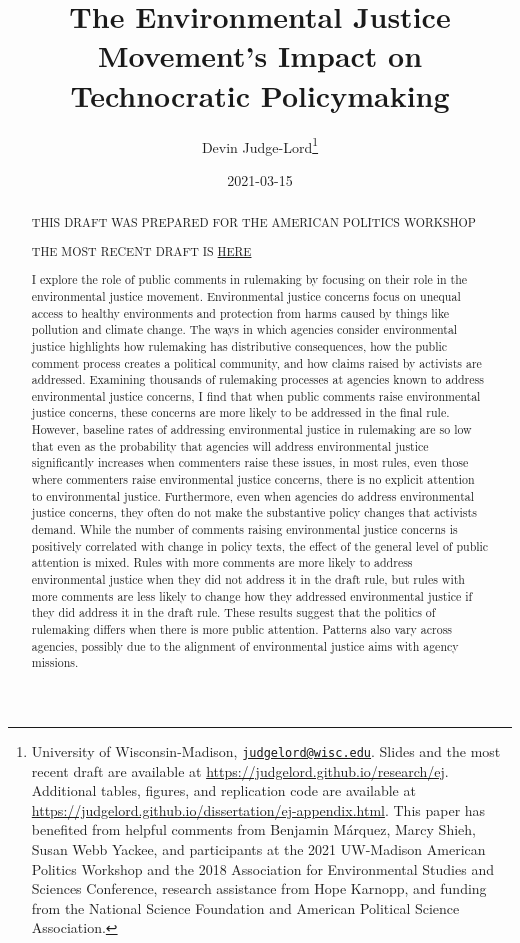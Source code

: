 \documentclass[
      12pt,
        ]{article}
\title{The Environmental Justice Movement's Impact on Technocratic Policymaking}
\author{ %
            Devin Judge-Lord\footnote{University of Wisconsin-Madison, \href{mailto:judgelord@wisc.edu}{\nolinkurl{judgelord@wisc.edu}}. Slides and the most recent draft are available at \url{https://judgelord.github.io/research/ej}. Additional tables, figures, and replication code are available at \url{https://judgelord.github.io/dissertation/ej-appendix.html}. This paper has benefited from helpful comments from Benjamin Márquez, Marcy Shieh, Susan Webb Yackee, and participants at the 2021 UW-Madison American Politics Workshop and the 2018 Association for Environmental Studies and Sciences Conference, research assistance from Hope Karnopp, and funding from the National Science Foundation and American Political Science Association.} 
            }
\date{2021-03-15}
\begin{document}
 


  \maketitle




  \begin{abstract}
    \noindent THIS DRAFT WAS PREPARED FOR THE AMERICAN POLITICS WORKSHOP

THE MOST RECENT DRAFT IS \href{https://judgelord.github.io/research/ej/}{HERE}

\bigskip

I explore the role of public comments in rulemaking by focusing on their role in the environmental justice movement. Environmental justice concerns focus on unequal access to healthy environments and protection from harms caused by things like pollution and climate change. The ways in which agencies consider environmental justice highlights how rulemaking has distributive consequences, how the public comment process creates a political community, and how claims raised by activists are addressed. Examining thousands of rulemaking processes at agencies known to address environmental justice concerns, I find that when public comments raise environmental justice concerns, these concerns are more likely to be addressed in the final rule. However, baseline rates of addressing environmental justice in rulemaking are so low that even as the probability that agencies will address environmental justice significantly increases when commenters raise these issues, in most rules, even those where commenters raise environmental justice concerns, there is no explicit attention to environmental justice. Furthermore, even when agencies do address environmental justice concerns, they often do not make the substantive policy changes that activists demand. While the number of comments raising environmental justice concerns is positively correlated with change in policy texts, the effect of the general level of public attention is mixed. Rules with more comments are more likely to address environmental justice when they did not address it in the draft rule, but rules with more comments are less likely to change how they addressed environmental justice if they did address it in the draft rule. These results suggest that the politics of rulemaking differs when there is more public attention. Patterns also vary across agencies, possibly due to the alignment of environmental justice aims with agency missions. 

    

  \end{abstract}
\end{document}
